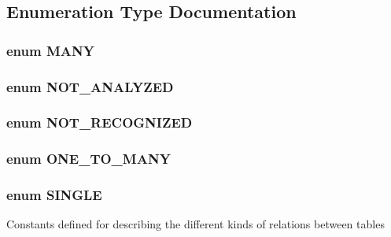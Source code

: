 \subsection{Enumeration Type Documentation}
\hypertarget{db_8php_a0146ef09f9a37e6ec7dbd719390f9de4}{
\subsubsection[{MANY}]{\setlength{\rightskip}{0pt plus 5cm}enum {\bf MANY}}}
\label{db_8php_a0146ef09f9a37e6ec7dbd719390f9de4}
\hypertarget{db_8php_ab2ccf7b117b4b822d61c1a3a07a528a2}{
\subsubsection[{NOT\_\-ANALYZED}]{\setlength{\rightskip}{0pt plus 5cm}enum {\bf NOT\_\-ANALYZED}}}
\label{db_8php_ab2ccf7b117b4b822d61c1a3a07a528a2}
\hypertarget{db_8php_a1b965efd4e0428b37a632346f4eef7e1}{
\subsubsection[{NOT\_\-RECOGNIZED}]{\setlength{\rightskip}{0pt plus 5cm}enum {\bf NOT\_\-RECOGNIZED}}}
\label{db_8php_a1b965efd4e0428b37a632346f4eef7e1}
\hypertarget{db_8php_ad2a8019952a8ce0c04e4fb3fbb4fe266}{
\subsubsection[{ONE\_\-TO\_\-MANY}]{\setlength{\rightskip}{0pt plus 5cm}enum {\bf ONE\_\-TO\_\-MANY}}}
\label{db_8php_ad2a8019952a8ce0c04e4fb3fbb4fe266}
\hypertarget{db_8php_a76b06276bbadc1b8d9e716c5d9326919}{
\subsubsection[{SINGLE}]{\setlength{\rightskip}{0pt plus 5cm}enum {\bf SINGLE}}}
\label{db_8php_a76b06276bbadc1b8d9e716c5d9326919}
Constants defined for describing the different kinds of relations between tables 